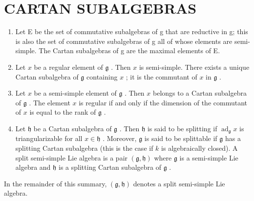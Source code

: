 \section*{CARTAN SUBALGEBRAS}

\begin{enumerate}
\def\labelenumi{\arabic{enumi})}
\item
  Let E be the set of commutative subalgebras of g that are reductive in g; this is also the set of commutative subalgebras of g all of whose elements are semi-simple. The Cartan subalgebras of g are the maximal elements of E.
\item
  Let \(x\) be a regular element of \(\mathfrak{g}\) . Then \(x\) is semi-simple. There exists a unique Cartan subalgebra of \(\mathfrak{g}\) containing \(x\) ; it is the commutant of \(x\) in \(\mathfrak{g}\) .
\item
  Let \(x\) be a semi-simple element of \(\mathfrak{g}\) . Then \(x\) belongs to a Cartan subalgebra of \(\mathfrak{g}\) . The element \(x\) is regular if and only if the dimension of the commutant of \(x\) is equal to the rank of \(\mathfrak{g}\) .
\item
  Let \(\mathfrak{h}\) be a Cartan subalgebra of \(\mathfrak{g}\) . Then \(\mathfrak{h}\) is said to be splitting if \(\operatorname{ad}_{\mathfrak{g}}x\) is triangularizable for all \(x \in \mathfrak{h}\) . Moreover, \(\mathfrak{g}\) is said to be splittable if \(\mathfrak{g}\) has a splitting Cartan subalgebra (this is the case if \(k\) is algebraically closed). A split semi-simple Lie algebra is a pair \((\mathfrak{g}, \mathfrak{h})\) where \(\mathfrak{g}\) is a semi-simple Lie algebra and \(\mathfrak{h}\) is a splitting Cartan subalgebra of \(\mathfrak{g}\) .
\end{enumerate}

In the remainder of this summary, \((\mathfrak{g},\mathfrak{h})\) denotes a split semi-simple Lie algebra.


